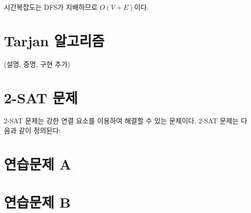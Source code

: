 시간복잡도는 DFS가 지배하므로 $O(V+E)$이다.

\section{Tarjan 알고리즘}
(설명, 증명, 구현 추가)

\section{2-SAT 문제}
2-SAT 문제는 강한 연결 요소를 이용하여 해결할 수 있는 문제이다. 2-SAT 문제는 다음과 같이 정의된다:

\section{연습문제 A}

\section{연습문제 B}


